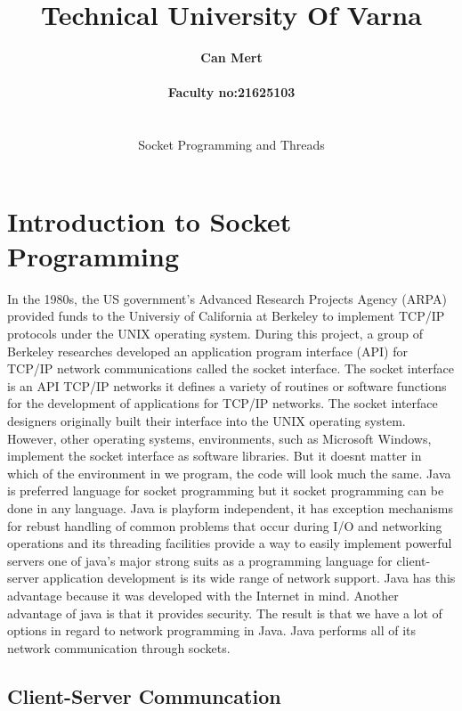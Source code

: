 \documentclass[12pt]{extarticle}
\begin{document}
\title{\Huge\textbf{ Technical University Of Varna}}
\author{\huge \textbf{ Can Mert} \\ \\ \Large \textbf{ Faculty no:21625103} \\ \\ \\  \LARGE Socket Programming and Threads} 

\date{}



\maketitle
\newpage
\section{Introduction to Socket Programming}

In the 1980s, the US government's Advanced Research Projects Agency (ARPA) provided
funds to the Universiy of California at Berkeley to implement TCP/IP protocols
under the UNIX operating system. During this project, a group of Berkeley researches
developed an application program interface (API) for TCP/IP network communications
called the socket interface. The socket interface is an API TCP/IP networks it defines
a variety of routines or software functions for the development of applications for TCP/IP networks.
The socket interface designers originally built their interface into the UNIX operating system.
However, other operating systems, environments, such as Microsoft Windows, implement the socket 
interface as software libraries. But it doesnt matter in which of the environment in we program, the code 
will look much the same. Java is preferred language for socket programming but it socket programming can
be done in any language. Java is playform independent, it has exception mechanisms for rebust handling
of common problems that occur during I/O and networking operations and its threading facilities provide
a way to easily implement powerful servers one of java's major strong suits as a programming language for
client-server application development is its wide range of network support. Java has this advantage 
because it was developed with the Internet in mind. Another advantage of java is that it provides 
security. The result is that we have a lot of options in regard to network programming in Java.
Java performs all of its network communication through sockets.

\subsection{Client-Server Communcation}
\end{document}
